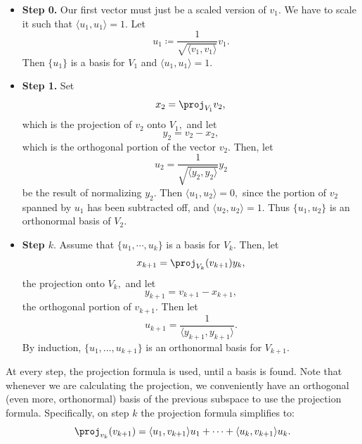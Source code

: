 \begin{itemize}
    \item \textbf{Step 0.} Our first vector must just be a scaled version of $v_1$. We have to scale it such that $\langle u_1, u_1 \rangle = 1$. 
    Let \[u_1 \coloneqq \frac{1}{\sqrt{\langle v_1, v_1 \rangle}}v_1.\] Then $\{u_1\}$ is a basis for $V_1$ and $\langle u_1, u_1 \rangle = 1.$
    
    \item \textbf{Step 1.} Set \[x_2 = \proj_{V_1}v_2,\] which is the projection of $v_2$ onto $V_1,$ and let \[y_2 = v_2 - x_2,\] which is the orthogonal portion of the vector $v_2.$ Then, let 
    \[
    u_2 = \frac{1}{\sqrt{\langle y_2, y_2\rangle}} y_2
    \]
    be the result of normalizing $y_2$. Then $\langle u_1, u_2 \rangle = 0,$ since the portion of $v_2$ spanned by $u_1 $ has been subtracted off, and $\langle u_2, u_2 \rangle = 1.$ Thus $\{u_1, u_2\}$ is an orthonormal basis of $V_2.$
    
    \item \textbf{Step $k.$} Assume that $\{u_1, \cdots, u_k\}$ is a basis for $V_k.$ Then, let 
    \[
    x_{k + 1} = \proj_{V_k}(v_{k + 1})y_k,
    \]
    the projection onto $V_k,$ and let
    \[
    y_{k + 1} = v_{k + 1} - x_{k + 1},
    \]
    the orthogonal portion of $v_{k +1}.$ Then let 
    \[
    u_{k + 1} = \frac{1}{\langle y_{k + 1}, y_{k + 1} \rangle}.
    \]
    By induction, $\{u_1, \ldots, u_{k+1} \}$ is an orthonormal basis for $V_{k+1}$.
    
    
    
\end{itemize}
At every step, the projection formula is used, until a basis is found. Note that whenever we are calculating the projection, we conveniently have an orthogonal (even more, orthonormal) basis of the previous subspace to use the projection formula.
Specifically, on step $k$ the projection formula simplifies to: \[ \proj_{v_k} (v_{k+1}) = \langle u_1, v_{k+1} \rangle u_1 + \cdots + \langle u_k, v_{k+1} \rangle u_k.\]

